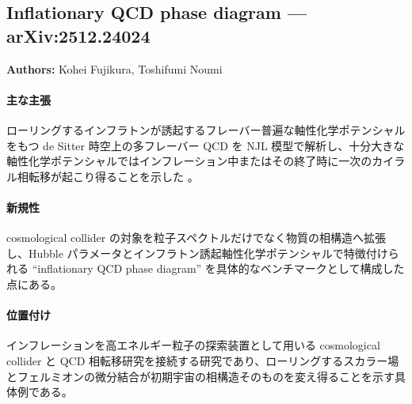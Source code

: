 \subsection{Inflationary QCD phase diagram --- arXiv:2512.24024}

\textbf{Authors:} Kohei Fujikura, Toshifumi Noumi

\paragraph{主な主張}
ローリングするインフラトンが誘起するフレーバー普遍な軸性化学ポテンシャルをもつ de Sitter 時空上の多フレーバー QCD を NJL 模型で解析し、十分大きな軸性化学ポテンシャルではインフレーション中またはその終了時に一次のカイラル相転移が起こり得ることを示した \cite{Fujikura:2025inflationary}。

\paragraph{新規性}
cosmological collider の対象を粒子スペクトルだけでなく物質の相構造へ拡張し、Hubble パラメータとインフラトン誘起軸性化学ポテンシャルで特徴付けられる ``inflationary QCD phase diagram'' を具体的なベンチマークとして構成した点にある。

\paragraph{位置付け}
インフレーションを高エネルギー粒子の探索装置として用いる cosmological collider と QCD 相転移研究を接続する研究であり、ローリングするスカラー場とフェルミオンの微分結合が初期宇宙の相構造そのものを変え得ることを示す具体例である。
